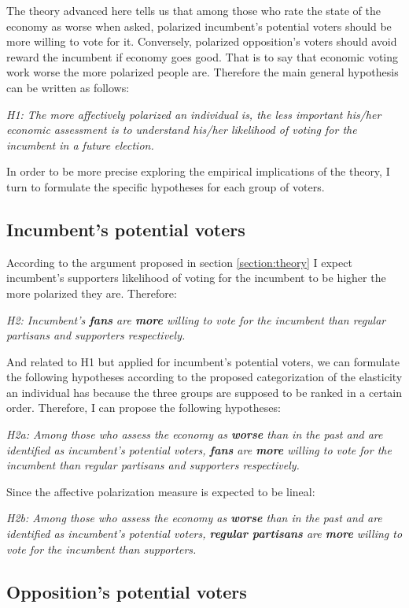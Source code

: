 \documentclass[a4paper, svgnames]{article}
\begin{document}
The theory advanced here tells us that among those who rate the state of the economy as worse when asked, polarized incumbent's potential voters should be more willing to vote for it. Conversely, polarized opposition's voters should avoid reward the incumbent if economy goes good. That is to say that economic voting work worse the more polarized people are. Therefore the main general hypothesis can be written as follows:

\textit{H1: The more affectively polarized an individual is, the less important his/her economic assessment is to understand his/her likelihood of voting for the incumbent in a future election.}

In order to be more precise exploring the empirical implications of the theory, I turn to formulate the specific hypotheses for each group of voters.

\subsection{Incumbent's potential voters}

According to the argument proposed in section \ref{section:theory} I expect incumbent's supporters likelihood of voting for the incumbent to be higher the more polarized they are. Therefore:

\textit{H2: Incumbent's \textbf{fans} are \textbf{more} willing to vote for the incumbent than regular partisans and supporters respectively.}

And related to H1 but applied for incumbent's potential voters, we can formulate the following hypotheses according to the proposed categorization of the elasticity an individual has because the three groups are supposed to be ranked in a certain order. Therefore, I can propose the following hypotheses:

\textit{H2a: Among those who assess the economy as \textbf{worse} than in the past and are identified as incumbent's potential voters, \textbf{fans} are \textbf{more} willing to vote for the incumbent than regular partisans and supporters respectively.}

Since the affective polarization measure is expected to be lineal:

\textit{H2b: Among those who assess the economy as \textbf{worse} than in the past and are identified as incumbent's potential voters, \textbf{regular partisans} are \textbf{more} willing to vote for the incumbent than supporters.}

\subsection{Opposition's potential voters}
\end{document}
